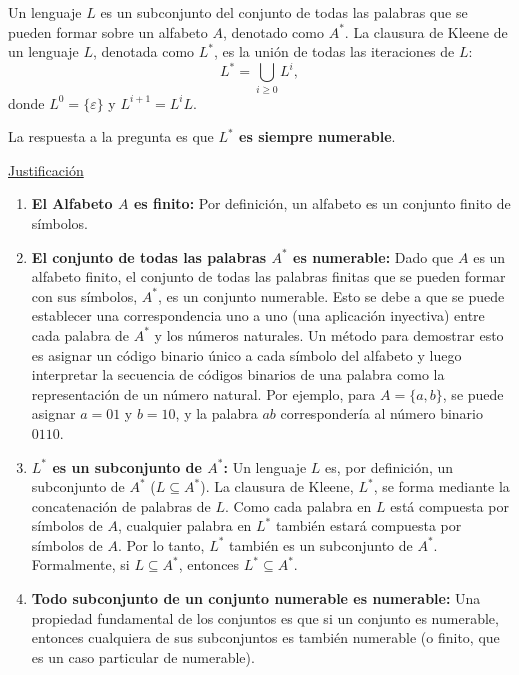 \documentclass[12pt]{book} %
\begin{document}
\begin{solucion}
Un lenguaje \(L\) es un subconjunto del conjunto de todas las palabras que se pueden formar sobre un alfabeto \(A\), denotado como \(A^*\). La clausura de Kleene de un lenguaje \(L\), denotada como \(L^*\), es la unión de todas las iteraciones de \(L\):
\[ L^* = \bigcup_{i \geq 0} L^i, \]
donde \(L^0 = \{\varepsilon\}\) y \(L^{i+1} = L^iL\).

La respuesta a la pregunta es que \textbf{\(L^*\) es siempre numerable}.

\underline{Justificación}

\begin{enumerate}
    \item \textbf{El Alfabeto \(A\) es finito:} Por definición, un alfabeto es un conjunto finito de símbolos.

    \item \textbf{El conjunto de todas las palabras \(A^*\) es numerable:} Dado que \(A\) es un alfabeto finito, el conjunto de todas las palabras finitas que se pueden formar con sus símbolos, \(A^*\), es un conjunto numerable. Esto se debe a que se puede establecer una correspondencia uno a uno (una aplicación inyectiva) entre cada palabra de \(A^*\) y los números naturales. Un método para demostrar esto es asignar un código binario único a cada símbolo del alfabeto y luego interpretar la secuencia de códigos binarios de una palabra como la representación de un número natural. Por ejemplo, para \(A = \{a, b\}\), se puede asignar \(a=01\) y \(b=10\), y la palabra \(ab\) correspondería al número binario \(0110\).

    \item \textbf{\(L^*\) es un subconjunto de \(A^*\):} Un lenguaje \(L\) es, por definición, un subconjunto de \(A^*\) (\(L \subseteq A^*\)). La clausura de Kleene, \(L^*\), se forma mediante la concatenación de palabras de \(L\). Como cada palabra en \(L\) está compuesta por símbolos de \(A\), cualquier palabra en \(L^*\) también estará compuesta por símbolos de \(A\). Por lo tanto, \(L^*\) también es un subconjunto de \(A^*\). Formalmente, si \(L \subseteq A^*\), entonces \(L^* \subseteq A^*\).

    \item \textbf{Todo subconjunto de un conjunto numerable es numerable:} Una propiedad fundamental de los conjuntos es que si un conjunto es numerable, entonces cualquiera de sus subconjuntos es también numerable (o finito, que es un caso particular de numerable).
\end{enumerate}


\end{solucion}
\end{document}
